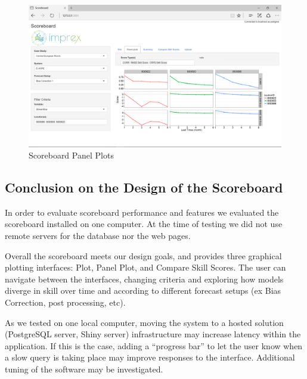 \documentclass[logos,parttoc,morelanguage=french,morelanguage=german]{orsay-memoire}
\begin{document}
\begin{figure}[h]
\centering
\includegraphics[width=0.90\linewidth]{images/isb7.png}
  \caption{Scoreboard Panel Plots}
  \label{fig:isb7}
\end{figure}


%


\subsection{Conclusion on the Design of the Scoreboard}

In order to evaluate scoreboard performance and features we evaluated the scoreboard installed on one computer. At the time of testing we did not use remote servers for the database nor the web pages.

Overall the scoreboard meets our design goals, and provides three graphical plotting interfaces: Plot, Panel Plot, and Compare Skill Scores. The user can navigate between the interfaces, changing criteria and exploring how models diverge in skill over time and according to different forecast setups (ex Bias Correction, post processing, etc).

As we tested on one local computer, moving the system to a hosted solution (PostgreSQL server, Shiny server) infrastructure may increase latency within the application. If this is the case, adding a ``progress bar'' to let the user know when a slow query is taking place may improve responses to the interface. Additional tuning of the software may be investigated.
\end{document}

